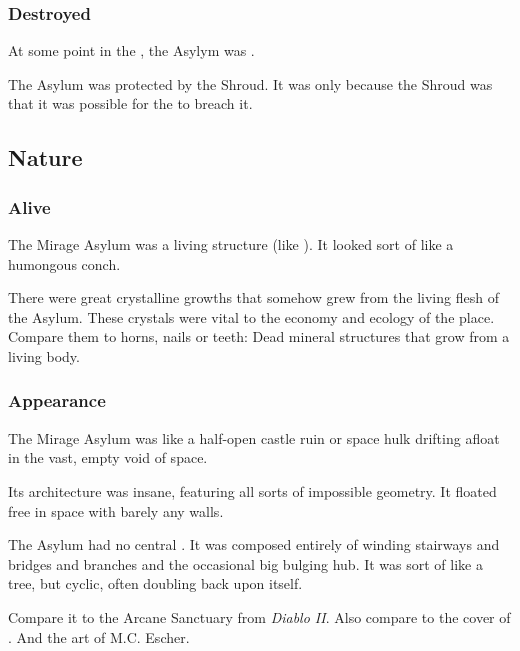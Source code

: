 \subsubsection{Destroyed}
At some point in the \thirdbanewar, the Asylym was . 

The Asylum was protected by the Shroud. 
It was only because the Shroud was  that it was possible for the \resphain{} to breach it. 









\subsection{Nature}





\subsubsection{Alive}
The Mirage Asylum was a living structure (like ). 
It looked sort of like a humongous conch. 

There were great crystalline growths that somehow grew from the living flesh of the Asylum. 
These crystals were vital to the economy and ecology of the place. 
Compare them to horns, nails or teeth: 
Dead mineral structures that grow from a living body. 





\subsubsection{Appearance}
The Mirage Asylum was like a half-open castle ruin or space hulk drifting afloat in the vast, empty void of space. 

Its architecture was insane, featuring all sorts of impossible geometry. 
It floated free in space with barely any walls. 

The Asylum had no central . 
It was composed entirely of winding stairways and bridges and branches and the occasional big bulging hub. 
It was sort of like a tree, but cyclic, often doubling back upon itself. 

Compare it to the Arcane Sanctuary from \emph{Diablo II}. 
Also compare to the cover of \cite{LimbonicArt:InAbhorrenceDementia}.
And the art of M.C. Escher.

